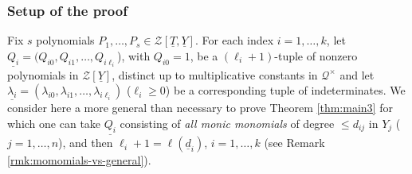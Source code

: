 \documentclass[11pt,a4paper,reqno]{amsart}
\theoremstyle{definition}
\begin{document}
\subsubsection{Setup of the proof} 
Fix $s$ polynomials $P_1,\ldots, P_s \in {\mathcal Z}[\underline T,\underline Y]$.
For each index $i=1,\ldots,k$, let ${\underline{Q_i}}= (Q_{i0}, Q_{i1},\ldots,Q_{i\ell_i}$), with $Q_{i0}=1$,
be a $(\ell_i+1)$-tuple of nonzero polynomials in ${\mathcal Z}[\underline{Y}]$, distinct up to multiplicative constants 
in $\mathcal{Q}^\times$ and let $\underline{\lambda_i}=(\lambda_{i0}, \lambda_{i1},\ldots,\lambda_{i\ell_i})$ 
($\ell_i \geq 0$) be a corresponding tuple of indeterminates. We consider here a more general than necessary to prove Theorem \ref{thm:main3} for which one can take ${\underline{Q_i}}$ consisting of \emph{all monic monomials} of degree $\leq d_{ij}$ in $Y_j$ ($j=1,\ldots,n$), and then $\ell_i+1 =\ell(\underline d_i)$, $i=1,\ldots,k$ (see Remark \ref{rmk:momomials-vs-general}).  
\end{document}
